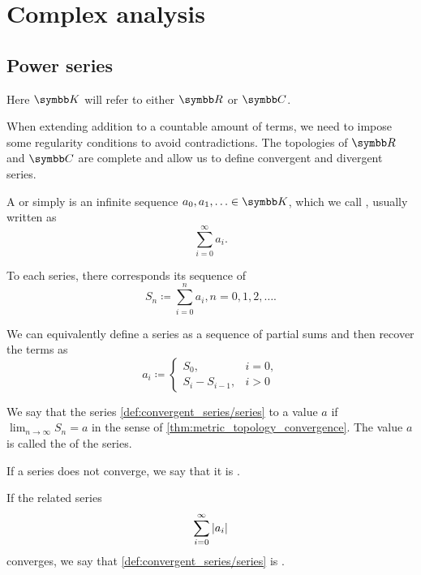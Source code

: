 \section{Complex analysis}\label{subsec:complex_analysis}
\subsection{Power series}\label{subsec:power_series}

Here \( \K \) will refer to either \( \R \) or \( \C \).

\begin{definition}\label{def:convergent_series}
  When extending addition to a countable amount of terms, we need to impose some regularity conditions to avoid contradictions. The topologies of \( \R \) and \( \C \) are complete and allow us to define convergent and divergent series.

  A  or simply  is an infinite sequence \( a_0, a_1, \ldots \in \K \), which we call , usually written as
  \begin{equation}\label{def:convergent_series/series}
    \sum_{i=0}^\infty a_i.
  \end{equation}

  To each series, there corresponds its sequence of 
  \begin{equation*}
    S_n \coloneqq \sum_{i=0}^n a_i, n = 0, 1, 2, \ldots.
  \end{equation*}

  We can equivalently define a series as a sequence of partial sums and then recover the terms as
  \begin{equation*}
    a_i \coloneqq \begin{cases}
      S_0,           &i = 0, \\
      S_i - S_{i-1}, &i > 0
    \end{cases}
  \end{equation*}

  We say that the series \cref{def:convergent_series/series}  to a value \( a \) if \( \lim_{n \to \infty} S_n = a \) in the sense of \cref{thm:metric_topology_convergence}. The value \( a \) is called the  of the series.

  If a series does not converge, we say that it is .

  If the related series
  \begin{equation}\label{def:convergent_series/absolute_series}
    \sum_{i=0}^\infty \left\vert a_i \right\vert
  \end{equation}
  converges, we say that \cref{def:convergent_series/series} is .
\end{definition}

